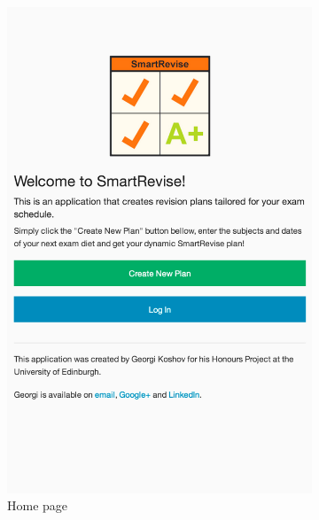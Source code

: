 \documentclass[bsc,frontabs,twoside,singlespacing,parskip]{infthesis}     %
\begin{document}
			\begin{figure}
			        \centering
			        \begin{subfigure}[b]{0.5\textwidth}
			                \includegraphics[width=\textwidth]{home}
			                \caption{Home page}
			                \label{fig:home}
			        \end{subfigure}%
			        ~ %
			        \begin{subfigure}[b]{0.5\textwidth}

\end{subfigure}
\end{figure}
\end{document}
